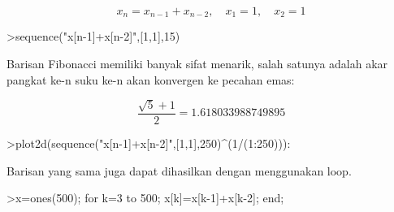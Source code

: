 \documentclass[12pt,arial,letterpaper]{book}
\begin{document}
\begin{eulernootebook}
\begin{eulercomment}
\begin{eulercomment}
\begin{eulernootebook}
\begin{eulercomment}
\begin{eulercomment}
\begin{eulercomment}
\begin{eulercomment}
\begin{eulercomment}
\begin{eulercomment}
\begin{eulernotebook}
\begin{eulercomment}
\begin{eulercomment}
\begin{eulercomment}
\begin{eulercomment}
\begin{eulercomment}
\begin{eulercomment}
\begin{eulercomment}
\begin{eulercomment}
\begin{eulercomment}
\begin{eulercomment}
\begin{eulercomment}
\begin{eulercomment}
\begin{eulercomment}
\begin{eulercomment}
\begin{eulercomment}
\begin{eulercomment}
\begin{eulercomment}
\begin{eulercomment}
\begin{eulercomment}
\begin{eulercomment}
\begin{eulercomment}
\begin{eulercomment}
\begin{eulercomment}
\begin{eulercomment}
\begin{eulercomment}
\begin{eulercomment}
\begin{eulercomment}
\end{eulercomment}
\begin{eulerformula}
\[
x_n = x_{n-1}+x_{n-2}, \quad x_1=1, \quad x_2 =1
\]
\end{eulerformula}
\begin{eulerprompt}
>sequence("x[n-1]+x[n-2]",[1,1],15)
\end{eulerprompt}
\begin{euleroutput}
  [1,  1,  2,  3,  5,  8,  13,  21,  34,  55,  89,  144,  233,  377,  610]
\end{euleroutput}
\begin{eulercomment}
Barisan Fibonacci memiliki banyak sifat menarik, salah satunya adalah
akar pangkat ke-n suku ke-n akan konvergen ke pecahan emas:
\end{eulercomment}
\begin{eulerformula}
\[
\frac{\sqrt{5}+1}{2}=1.618033988749895
\]
\end{eulerformula}
\begin{eulerprompt}
>plot2d(sequence("x[n-1]+x[n-2]",[1,1],250)^(1/(1:250))):
\end{eulerprompt}
\begin{eulercomment}
Barisan yang sama juga dapat dihasilkan dengan menggunakan loop.
\end{eulercomment}
\begin{eulerprompt}
>x=ones(500); for k=3 to 500; x[k]=x[k-1]+x[k-2]; end;
\end{eulerprompt}
\begin{eulercomment}

\end{eulercomment}
\end{eulercomment}
\end{eulercomment}
\end{eulercomment}
\end{eulercomment}
\end{eulercomment}
\end{eulercomment}
\end{eulercomment}
\end{eulercomment}
\end{eulercomment}
\end{eulercomment}
\end{eulercomment}
\end{eulercomment}
\end{eulercomment}
\end{eulercomment}
\end{eulercomment}
\end{eulercomment}
\end{eulercomment}
\end{eulercomment}
\end{eulercomment}
\end{eulercomment}
\end{eulercomment}
\end{eulercomment}
\end{eulercomment}
\end{eulercomment}
\end{eulercomment}
\end{eulercomment}
\end{eulernotebook}
\end{eulercomment}
\end{eulercomment}
\end{eulercomment}
\end{eulercomment}
\end{eulercomment}
\end{eulercomment}
\end{eulernootebook}
\end{eulercomment}
\end{eulercomment}
\end{eulernootebook}
\end{document}
